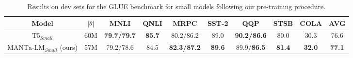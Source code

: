 


\begin{table}[]
\centering\small

\begin{adjustbox}{width=1\textwidth}

\begin{tabular}{cccccccccc}
\toprule
Model                                   & $|\theta|$ & MNLI      & QNLI & MRPC      & SST-2 & QQP       & STSB & COLA & AVG  \\ \midrule
$\text{T5}_{Small}$                     & 60M       & \textbf{79.7/79.7} & \textbf{85.7} & 80.2/86.2 & 89.0  & \textbf{90.2/86.6} & 80.0 & 30.3 & 76.6 \\[3pt]
$\text{MANTa-LM}_{Small}$ (ours)     & 57M          & 79.2/78.6 & 84.5 & \textbf{82.3/87.2}    & \textbf{89.6}  & 89.9/\textbf{86.5}    & \textbf{81.4} & \textbf{32.0} & \textbf{77.1} \\ \bottomrule
\end{tabular}
\end{adjustbox}
\caption{Results on dev sets for the GLUE benchmark for small models following our pre-training procedure.}
\label{tab:glue_small}


\end{table}

